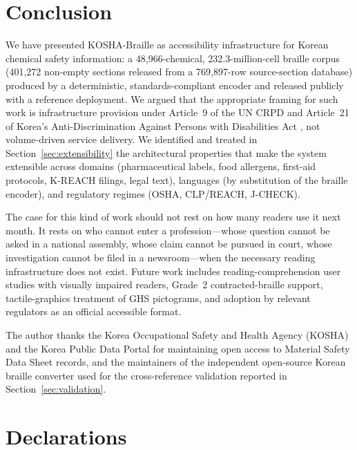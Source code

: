 \documentclass[smallextended]{svjour3}
\begin{document}
\section{Conclusion}
\label{sec:conclusion}

We have presented KOSHA-Braille as accessibility infrastructure for Korean chemical safety information: a 48{,}966-chemical, 232.3-million-cell braille corpus (401{,}272 non-empty sections released from a 769{,}897-row source-section database) produced by a deterministic, standards-compliant encoder and released publicly with a reference deployment. We argued that the appropriate framing for such work is infrastructure provision under Article~9 of the UN CRPD \cite{crpd} and Article~21 of Korea's Anti-Discrimination Against Persons with Disabilities Act \cite{kdpa}, not volume-driven service delivery. We identified and treated in Section~\ref{sec:extensibility} the architectural properties that make the system extensible across domains (pharmaceutical labels, food allergens, first-aid protocols, K-REACH filings, legal text), languages (by substitution of the braille encoder), and regulatory regimes (OSHA, CLP/REACH, J-CHECK).

The case for this kind of work should not rest on how many readers use it next month. It rests on who cannot enter a profession---whose question cannot be asked in a national assembly, whose claim cannot be pursued in court, whose investigation cannot be filed in a newsroom---when the necessary reading infrastructure does not exist. Future work includes reading-comprehension user studies with visually impaired readers, Grade~2 contracted-braille support, tactile-graphics treatment of GHS pictograms, and adoption by relevant regulators as an official accessible format.

\begin{acknowledgements}
The author thanks the Korea Occupational Safety and Health Agency (KOSHA) and the Korea Public Data Portal for maintaining open access to Material Safety Data Sheet records, and the maintainers of the independent open-source Korean braille converter \cite{hangul_braille_converter} used for the cross-reference validation reported in Section~\ref{sec:validation}.
\end{acknowledgements}

\section*{Declarations}
\end{document}
